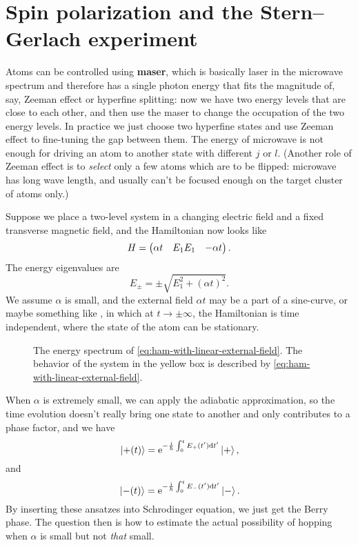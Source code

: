 \documentclass[hyperref, a4paper]{article}
\newcommand*{\ii}{\mathrm{i}}
\newcommand*{\ee}{\mathrm{e}}
\newcommand*{\concept}[1]{{\textbf{#1}}}
\def\\{}%
\begin{document}
\section{Spin polarization and the Stern–Gerlach experiment}

Atoms can be controlled using \concept{maser},
which is basically laser in the microwave spectrum
and therefore has a single photon energy 
that fits the magnitude of, say, Zeeman effect 
or hyperfine splitting:
now we have two energy levels that are close to each other, 
and then use the maser to change the occupation of the two energy levels. 
In practice we just choose two hyperfine states 
and use Zeeman effect to fine-tuning the gap between them.
The energy of microwave is not enough for 
driving an atom to another state with different $j$ or $l$.
(Another role of Zeeman effect is to \emph{select} only a few atoms 
which are to be flipped: 
microwave has long wave length, 
and usually can't be focused enough on the target cluster of atoms only.)

Suppose we place a two-level system in a changing electric field
and a fixed transverse magnetic field, 
and the Hamiltonian now looks like 
\begin{equation}
    H = \pmqty{
        \alpha t & E_1 \\ E_1 & - \alpha t
    }.
    \label{eq:ham-with-linear-external-field}
\end{equation}
The energy eigenvalues are 
\begin{equation}
    E_\pm = \pm \sqrt{ E_1^2 + (\alpha t)^2 }.
\end{equation}
We assume $\alpha$ is small, 
and the external field $\alpha t$ 
may be a part of a sine-curve, or maybe something like 
,
in which at $t \to \pm \infty$, 
the Hamiltonian is time independent, 
where the state of the atom can be stationary.

\begin{figure}
    \centering
    
    \caption{The energy spectrum of \eqref{eq:ham-with-linear-external-field}.
    The behavior of the system in the yellow box is described by \eqref{eq:ham-with-linear-external-field}.}
    \label{fig:external-field-slow-1}
\end{figure}

When $\alpha$ is extremely small,
we can apply the adiabatic approximation, 
so the time evolution doesn't really bring 
one state to another 
and only contributes to a phase factor, 
and we have 
\begin{equation}
    \ket*{+ (t)} = \ee^{- \frac{\ii}{\hbar}\int_{0}^{t} E_+ (t') \dd{t'} } \ket*{+}, 
\end{equation}
and 
\begin{equation}
    \ket*{- (t)} = \ee^{- \frac{\ii}{\hbar}\int_{0}^{t} E_- (t') \dd{t'} } \ket*{-}. 
\end{equation}
By inserting these ansatzes into Schrodinger equation, 
we just get the Berry phase.
The question then is how to estimate 
the actual possibility of hopping 
when $\alpha$ is small but not \emph{that} small.
\end{document}
